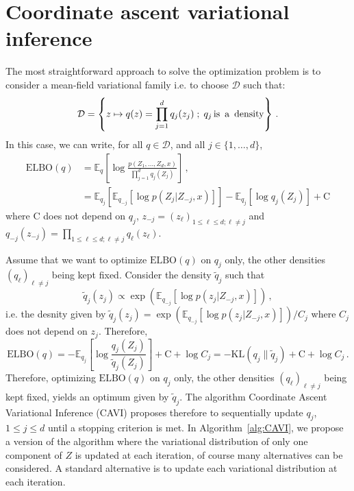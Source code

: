 \documentclass[english,graybox,envcountchap,envcountsame,sectrefs,shortlabels]{svmono}
\theoremstyle{style}
\begin{document}
\section*{Coordinate ascent variational inference}
The most straightforward approach to solve the optimization problem is to consider a mean-field variational family  i.e. to choose $\mathcal{D}$ such that: 
$$
\mathcal{D} = \left\{z\mapsto q(z) = \prod_{j=1}^dq_j(z_j)\;;\; q_j \,\mbox{is\, a\, density} \right\}\,.
$$
In this case, we can write, for all $q\in \mathcal{D}$, and all $j\in\{1,\ldots,d\}$,
\begin{align*}
\mathrm{ELBO}(q) &= \mathbb{E}_{q}\left[\log \frac{p(Z_1,\ldots,Z_d,x)}{\prod_{j=1}^dq_j(Z_j)}\right]\,,\\
&= \mathbb{E}_{q_j}\left[\mathbb{E}_{q_{-j}}\left[\log p(Z_j | Z_{-j},x)\right]\right] - \mathbb{E}_{q_j}\left[\log q_j(Z_j)\right]  + \mathrm{C}
\end{align*}
where $\mathrm{C}$ does not depend on $q_j$,  $z_{-j} = (z_\ell)_{1\leq \ell \leq d; \ell \neq j}$ and $q_{-j}(z_{-j}) = \prod_{1\leq \ell \leq d; \ell \neq j}q_{\ell}(z_{\ell})$. 

\medskip

Assume that we want to optimize $\mathrm{ELBO}(q) $ on $q_j$ only, the other densities $(q_\ell)_{\ell\neq j}$ being kept fixed. Consider the density $\tilde q_j$ such that
$$
\tilde q_j(z_j) \propto \exp\left(\mathbb{E}_{q_{-j}}\left[\log p(z_j | Z_{-j},x)\right]\right)\,,
$$
i.e. the desnity given by $\tilde q_j(z_j)= \exp(\mathbb{E}_{q_{-j}}[\log p(z_j | Z_{-j},x)])/C_j$ where $C_j$ does not depend on $z_j$. Therefore,
$$
\mathrm{ELBO}(q) = -\mathbb{E}_{q_j}\left[\log \frac{q_j(Z_j)}{\tilde q_j(Z_j) }\right]  + \mathrm{C} + \log C_j = -\mathrm{KL}(q_j\|\tilde q_j)  + \mathrm{C} + \log C_j\,.
$$
Therefore, optimizing  $\mathrm{ELBO}(q) $ on $q_j$ only, the other densities $(q_\ell)_{\ell\neq j}$ being kept fixed, yields an optimum given by $\tilde q_j$.
The algorithm Coordinate Ascent Variational Inference (CAVI) proposes therefore to sequentially update  $q_j$, $1\leq j \leq d$ until a stopping criterion is met. In Algorithm~\ref{alg:CAVI}, we propose a version of the algorithm where the variational distribution of only one component of $Z$ is updated at each iteration, of course many alternatives can be considered. A standard alternative is to update each variational distribution at each iteration.

\begin{algorithm}[H] \label{alg:CAVI}
\end{algorithm}
\end{document}
